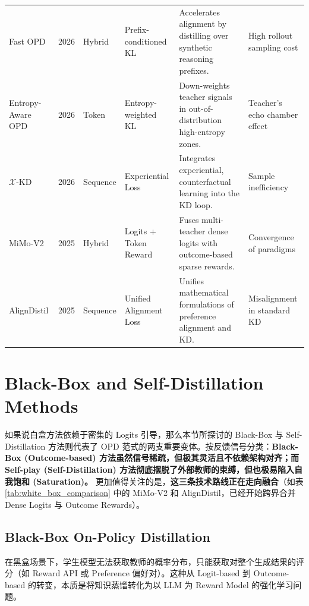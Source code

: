 \documentclass{article}
\begin{document}
\begin{table}[tbp]
{\begin{tabular}{l c l l p{6cm} p{3.5cm}}
        Fast OPD & 2026 & Hybrid & Prefix-conditioned KL & Accelerates alignment by distilling over synthetic reasoning prefixes. & High rollout sampling cost \\
        Entropy-Aware OPD& 2026 & Token & Entropy-weighted KL & Down-weights teacher signals in out-of-distribution high-entropy zones. & Teacher's echo chamber effect \\
        $\mathcal{X}$-KD & 2026 & Sequence & Experiential Loss & Integrates experiential, counterfactual learning into the KD loop. & Sample inefficiency \\
        MiMo-V2 & 2025 & Hybrid & Logits + Token Reward & Fuses multi-teacher dense logits with outcome-based sparse rewards. & Convergence of paradigms \\
        AlignDistil & 2025 & Sequence & Unified Alignment Loss & Unifies mathematical formulations of preference alignment and KD. & Misalignment in standard KD \\
        \bottomrule
    \end{tabular}
    }
\end{table}


\section{Black-Box and Self-Distillation Methods}
\label{sec:black_box}

如果说白盒方法依赖于密集的 Logits 引导，那么本节所探讨的 Black-Box 与 Self-Distillation 方法则代表了 OPD 范式的两支重要变体。按反馈信号分类：\textbf{Black-Box (Outcome-based) 方法虽然信号稀疏，但极其灵活且不依赖架构对齐；而 Self-play (Self-Distillation) 方法彻底摆脱了外部教师的束缚，但也极易陷入自我饱和 (Saturation)。} 更加值得关注的是，\textbf{这三条技术路线正在走向融合}（如表 \ref{tab:white_box_comparison} 中的 MiMo-V2 和 AlignDistil，已经开始跨界合并 Dense Logits 与 Outcome Rewards）。

\subsection{Black-Box On-Policy Distillation}
\label{subsec:black_box_opd}

在黑盒场景下，学生模型无法获取教师的概率分布，只能获取对整个生成结果的评分（如 Reward API 或 Preference 偏好对）。这种从 Logit-based 到 Outcome-based 的转变，本质是将知识蒸馏转化为以 LLM 为 Reward Model 的强化学习问题。
\end{document}
